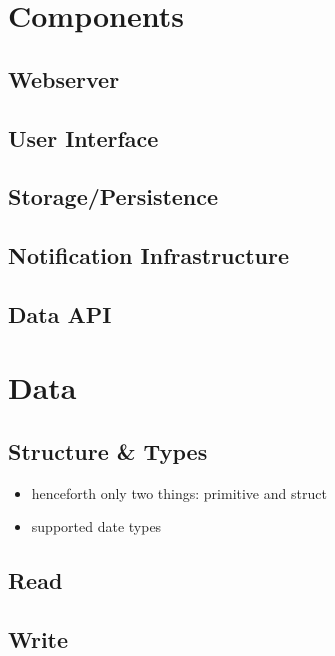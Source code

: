 \documentclass[12pt,english,a4paper,titlepage,cleardoublepage=empty,dottedtoc]{report}
\providecommand{\tightlist}{%
  \setlength{\itemsep}{0pt}\setlength{\parskip}{0pt}}
\begin{document}
\section{Components}\label{components}

\subsection{Webserver}\label{webserver}

\subsection{User Interface}\label{user-interface-1}

\subsection{Storage/Persistence}\label{storagepersistence}

\subsection{Notification
Infrastructure}\label{notification-infrastructure-1}

\subsection{Data API}\label{data-api}

\section{Data}\label{data-1}

\subsection{Structure \& Types}\label{structure-types}

\begin{itemize}
\tightlist
\item
  henceforth only two things: primitive and struct
\item
  supported date types
\end{itemize}

\subsection{Read}\label{read}

\subsection{Write}\label{write}
\end{document}
